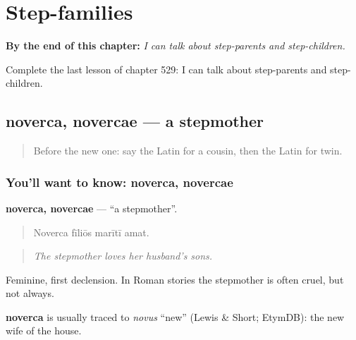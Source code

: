 
\chapter{Step-families}
\label{ch:la-step-families}

\begin{chapteropening}
\textbf{By the end of this chapter:} \emph{I can talk about step-parents and step-children.}

Complete the last lesson of chapter 529: I can talk about step-parents and step-children.
\end{chapteropening}

\section[noverca, novercae]{noverca, novercae — a stepmother}

\label{lesson:LA-C529-noverca}



\begin{quote}
Before the new one: say the Latin for a cousin, then the Latin for twin.
\end{quote}

\subsection*{You'll want to know: noverca, novercae}
\textbf{noverca, novercae} — \textquotedblleft{}a stepmother\textquotedblright{}.

\begin{quote}
Noverca fīliōs marītī amat.
\end{quote}

\begin{quote}
\emph{The stepmother loves her husband's sons.}
\end{quote}

Feminine, first declension. In Roman stories the stepmother is often cruel, but not always.

\begin{cousinweb}
\textbf{noverca} is usually traced to \emph{novus} \textquotedblleft{}new\textquotedblright{} (Lewis \& Short; EtymDB): the new wife of the house.
\end{cousinweb}

